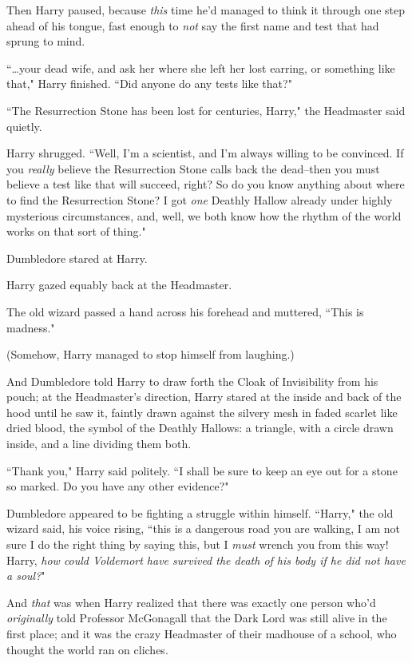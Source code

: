 Then Harry paused, because \emph{this} time he'd managed to think it through one step ahead of his tongue, fast enough to \emph{not} say the first name and test that had sprung to mind.

``{\ldots}your dead wife, and ask her where she left her lost earring, or something like that," Harry finished. ``Did anyone do any tests like that?"

``The Resurrection Stone has been lost for centuries, Harry," the Headmaster said quietly.

Harry shrugged. ``Well, I'm a scientist, and I'm always willing to be convinced. If you \emph{really} believe the Resurrection Stone calls back the dead\---then you must believe a test like that will succeed, right? So do you know anything about where to find the Resurrection Stone? I got \emph{one} Deathly Hallow already under highly mysterious circumstances, and, well, we both know how the rhythm of the world works on that sort of thing."

Dumbledore stared at Harry.

Harry gazed equably back at the Headmaster.

The old wizard passed a hand across his forehead and muttered, ``This is madness."

(Somehow, Harry managed to stop himself from laughing.)

And Dumbledore told Harry to draw forth the Cloak of Invisibility from his pouch; at the Headmaster's direction, Harry stared at the inside and back of the hood until he saw it, faintly drawn against the silvery mesh in faded scarlet like dried blood, the symbol of the Deathly Hallows: a triangle, with a circle drawn inside, and a line dividing them both.

``Thank you," Harry said politely. ``I shall be sure to keep an eye out for a stone so marked. Do you have any other evidence?"

Dumbledore appeared to be fighting a struggle within himself. ``Harry," the old wizard said, his voice rising, ``this is a dangerous road you are walking, I am not sure I do the right thing by saying this, but I \emph{must} wrench you from this way! Harry, \emph{how could Voldemort have survived the death of his body if he did not have a soul?}"

And \emph{that} was when Harry realized that there was exactly one person who'd \emph{originally} told Professor McGonagall that the Dark Lord was still alive in the first place; and it was the crazy Headmaster of their madhouse of a school, who thought the world ran on cliches.

